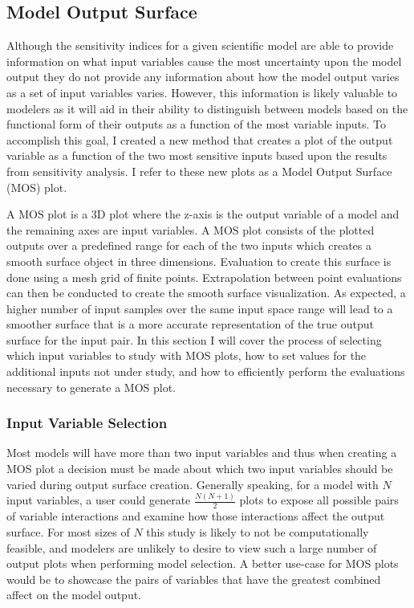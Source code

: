 \subsection{Model Output Surface\label{sec:out_surf}}
Although the sensitivity indices for a given scientific model are able to provide information on what input variables cause the most uncertainty upon the model output they do not provide any information about how the model output varies as a set of input variables varies.
However, this information is likely valuable to modelers as it will aid in their ability to distinguish between models based on the functional form of their outputs as a function of the most variable inputs.
To accomplish this goal, I created a new method that creates a plot of the output variable as a function of the two most sensitive inputs based upon the results from sensitivity analysis.
I refer to these new plots as a Model Output Surface (MOS) plot.

A MOS plot is a 3D plot where the z-axis is the output variable of a model and the remaining axes are input variables.
A MOS plot consists of the plotted outputs over a predefined range for each of the two inputs which creates a smooth surface object in three dimensions.
Evaluation to create this surface is done using a mesh grid of finite points.
Extrapolation between point evaluations can then be conducted to create the smooth surface visualization.
As expected, a higher number of input samples over the same input space range will lead to a smoother surface that is a more accurate representation of the true output surface for the input pair.
In this section I will cover the process of selecting which input variables to study with MOS plots, how to set values for the additional inputs not under study, and how to efficiently perform the evaluations necessary to generate a MOS plot.

\subsubsection{Input Variable Selection\label{sec:inp_var_sel}}
Most models will have more than two input variables and thus when creating a MOS plot a decision must be made about which two input variables should be varied during output surface creation. Generally speaking, for a model with $N$ input variables, a user could generate $\frac{N(N+1)}{2}$ plots to expose all possible pairs of variable interactions and examine how those interactions affect the output surface. For most sizes of $N$ this study is likely to not be computationally feasible, and modelers are unlikely to desire to view such a large number of output plots when performing model selection. A better use-case for MOS plots would be to showcase the pairs of variables that have the greatest combined affect on the model output.

